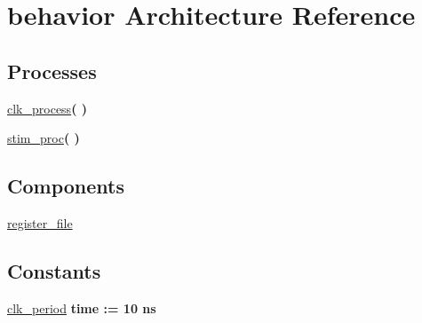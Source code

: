 \hypertarget{classregister__file__tb_1_1behavior}{\section{behavior \-Architecture \-Reference}
\label{classregister__file__tb_1_1behavior}
}
\*
\*
\subsection*{\-Processes}
 \begin{DoxyCompactItemize}
\item 
\hyperlink{classregister__file__tb_1_1behavior_ac5bb218131b813f7908ec89476b31fca}{clk\-\_\-process}{\bfseries  (  )}
\item 
\hyperlink{classregister__file__tb_1_1behavior_ad2efa6785cff833c341e27596b21aeb5}{stim\-\_\-proc}{\bfseries  (  )}
\end{DoxyCompactItemize}
\subsection*{\-Components}
 \begin{DoxyCompactItemize}
\item 
\hyperlink{classregister__file__tb_1_1behavior_a30c07c12ac7de69a43a0ab69d9b489c8}{register\-\_\-file}  {\bfseries }  
\end{DoxyCompactItemize}
\subsection*{\-Constants}
 \begin{DoxyCompactItemize}
\item 
\hyperlink{classregister__file__tb_1_1behavior_af0873cae5a748f5df114f8d3add8cafe}{clk\-\_\-period} {\bfseries time  \-:=  10  ns } 
\end{DoxyCompactItemize}
